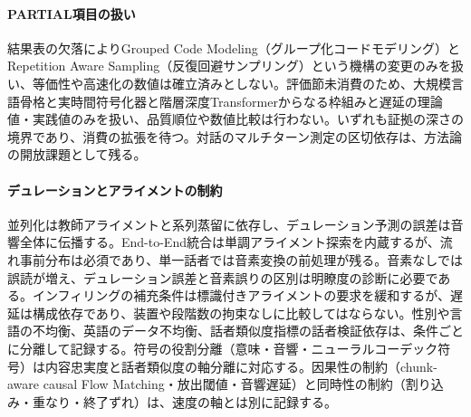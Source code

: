 \documentclass[lualatex,a4paper,10pt]{jlreq}
\begin{document}
\paragraph{PARTIAL項目の扱い}
結果表の欠落によりGrouped Code Modeling（グループ化コードモデリング）とRepetition Aware Sampling（反復回避サンプリング）という機構の変更のみを扱い、等価性や高速化の数値は確立済みとしない\autocite{btd059}。評価節未消費のため、大規模言語骨格と実時間符号化器と階層深度Transformerからなる枠組みと遅延の理論値・実践値のみを扱い、品質順位や数値比較は行わない\autocite{btd134}。いずれも証拠の深さの境界であり、消費の拡張を待つ\autocite{btd059,btd134}。対話のマルチターン測定の区切依存は、方法論の開放課題として残る\autocite{btd134}。

\paragraph{デュレーションとアライメントの制約}
並列化は教師アライメントと系列蒸留に依存し、デュレーション予測の誤差は音響全体に伝播する\autocite{btd054}。End-to-End統合は単調アライメント探索を内蔵するが、流れ事前分布は必須であり、単一話者では音素変換の前処理が残る\autocite{btd056}。音素なしでは誤読が増え、デュレーション誤差と音素誤りの区別は明瞭度の診断に必要である\autocite{btd054,btd056}。インフィリングの補充条件は標識付きアライメントの要求を緩和するが、遅延は構成依存であり、装置や段階数の拘束なしに比較してはならない\autocite{btd060,btd132}。性別や言語の不均衡、英語のデータ不均衡、話者類似度指標の話者検証依存は、条件ごとに分離して記録する\autocite{btd056,btd132,btd133}。符号の役割分離（意味・音響・ニューラルコーデック符号）は内容忠実度と話者類似度の軸分離に対応する\autocite{btd057,btd058,btd133}。因果性の制約（chunk-aware causal Flow Matching・放出閾値・音響遅延）と同時性の制約（割り込み・重なり・終了ずれ）は、速度の軸とは別に記録する\autocite{btd062,btd133,btd134}。
\end{document}
